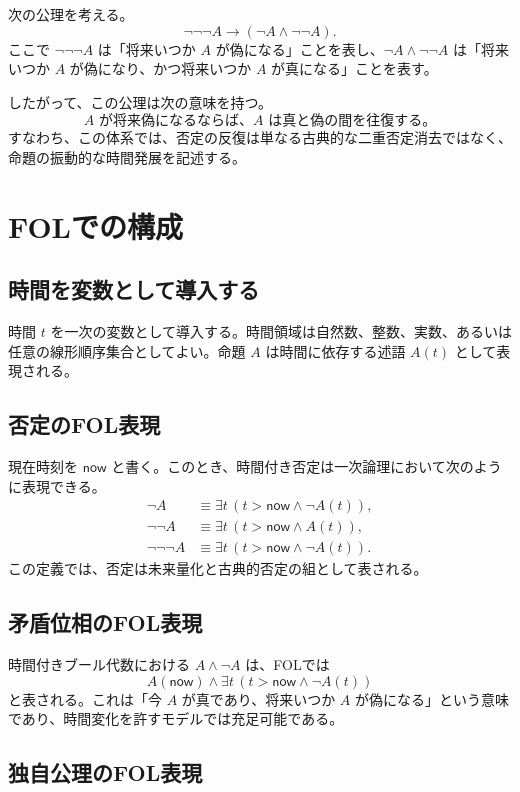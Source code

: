 \documentclass[10pt]{ltjsarticle}
\begin{document}
次の公理を考える。
\[
  \neg\neg\neg A \to (\neg A \land \neg\neg A).
\]
ここで $\neg\neg\neg A$ は「将来いつか $A$ が偽になる」ことを表し、$\neg A \land \neg\neg A$ は「将来いつか $A$ が偽になり、かつ将来いつか $A$ が真になる」ことを表す。

したがって、この公理は次の意味を持つ。
\[
  \text{$A$ が将来偽になるならば、$A$ は真と偽の間を往復する。}
\]
すなわち、この体系では、否定の反復は単なる古典的な二重否定消去ではなく、命題の振動的な時間発展を記述する。

\section{FOLでの構成}

\subsection{時間を変数として導入する}

時間 $t$ を一次の変数として導入する。時間領域は自然数、整数、実数、あるいは任意の線形順序集合としてよい。命題 $A$ は時間に依存する述語 $A(t)$ として表現される。

\subsection{否定のFOL表現}

現在時刻を $\mathsf{now}$ と書く。このとき、時間付き否定は一次論理において次のように表現できる。
\begin{align*}
  \neg A &\equiv \exists t\,(t > \mathsf{now} \land \neg A(t)), \\
  \neg\neg A &\equiv \exists t\,(t > \mathsf{now} \land A(t)), \\
  \neg\neg\neg A &\equiv \exists t\,(t > \mathsf{now} \land \neg A(t)).
\end{align*}
この定義では、否定は未来量化と古典的否定の組として表される。

\subsection{矛盾位相のFOL表現}

時間付きブール代数における $A \land \neg A$ は、FOLでは
\[
  A(\mathsf{now}) \land \exists t\,(t > \mathsf{now} \land \neg A(t))
\]
と表される。これは「今 $A$ が真であり、将来いつか $A$ が偽になる」という意味であり、時間変化を許すモデルでは充足可能である。

\subsection{独自公理のFOL表現}
\end{document}
